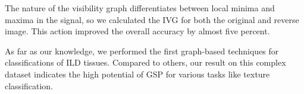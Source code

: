 \documentclass[conference]{IEEEtran}
\begin{document}
The nature of the visibility graph differentiates between local minima and maxima in the signal, so we calculated the IVG for both the original and reverse image. This action improved the overall accuracy by almost five percent.

As far as our knowledge, we performed the first graph-based techniques for classifications of ILD tissues. Compared to others, our result on this complex dataset indicates the high potential of GSP for various tasks like texture classification.





\vspace{12pt}
\end{document}
